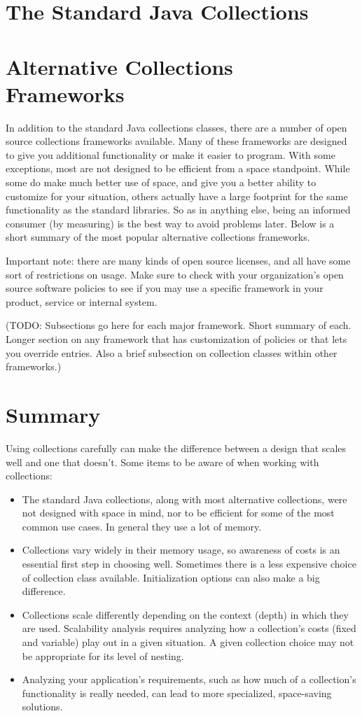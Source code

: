 \section{The Standard Java Collections}
\section{Alternative Collections Frameworks}
In addition to the standard Java collections classes, there are a number of
open source collections frameworks available. Many of these frameworks
are designed to give you additional functionality or make it easier to
program. With some exceptions, most are not designed to be efficient from a
space standpoint. While some do make much better use of space, and give you a
better ability to customize for your situation, others actually have a
large footprint for the same functionality as the standard libraries. So as in
anything else, being an informed consumer (by measuring) is the best way to
avoid problems later. Below is a short summary of the most
popular alternative collections frameworks.

Important note: there are many kinds of open source licenses, and all have some
sort of restrictions on usage. Make sure to check with your organization's open
source software policies to see if you may use a specific framework in 
your product, service or internal system.

(TODO: Subsections go here for each major framework. Short summary of each.
Longer section on any framework that has customization of policies or that lets you override
entries. Also a brief subsection on collection classes within other frameworks.)

\section{Summary}
Using collections carefully can
make the difference between a design that scales well and one that
doesn't. Some items to be aware of when working with collections:
\begin{itemize}
  \item The standard Java collections, along with most alternative
  collections, were not designed with space in mind, nor to be efficient for
  some of the most common use cases. In general they use a lot of memory.
  \item Collections vary widely in their memory usage, so awareness of
  costs is an essential first step in choosing well. Sometimes there is a less
  expensive choice of collection class available. Initialization options
  can also make a big difference.
  \item Collections scale differently depending on the context (depth) in which
  they are used. Scalability analysis requires analyzing how a collection's
  costs (fixed and variable) play out in a given situation. A given collection
  choice may not be appropriate for its level of nesting.
  \item Analyzing your application's requirements, such as 
  how much of a collection's functionality is really needed, can lead to more
  specialized, space-saving solutions.
\end{itemize}
